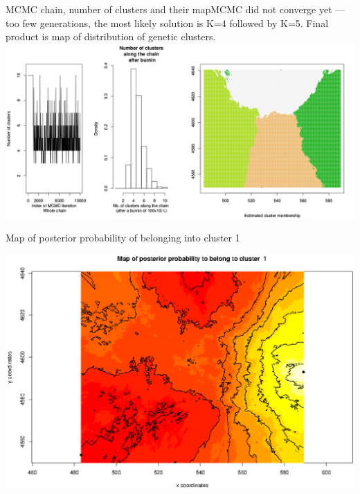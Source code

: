 \documentclass[compress, ucs, xelatex, 11pt, xcolor=svgnames,
	hyperref={
		bookmarks=true,
		unicode=true,
		colorlinks=true,
		pdftitle={Molecular data in R},
		plainpages=false,
		pdfauthor={Vojtech Zeisek},
		pdfsubject={Course about phylogeny and evolution in R},
		pdfcreator={XeLaTeX},
		pdfkeywords={R, evolution, phylogeny, molecular data},
		linkcolor=Tomato,
		anchorcolor=SaddleBrown,
		citecolor=Goldenrod,
		filecolor=DarkMagenta,
		menucolor=Sienna,
		urlcolor=DarkTurquoise,
		pdftex},
	url={hyphens, lowtilde} %
	]{beamer}
\begin{document}
\begin{frame}{MCMC chain, number of clusters and their map}{MCMC did not converge yet --- too few generations, the most likely solution is K=4 followed by K=5. Final product is map of distribution of genetic clusters.}
	\includegraphics[width=\textwidth]{geneland1.png}
\end{frame}

\begin{frame}{Map of posterior probability of belonging into cluster 1}
	\begin{center}
		\includegraphics[width=\textwidth-1.5cm]{geneland2.png}
	\end{center}
\end{frame}
\end{document}

